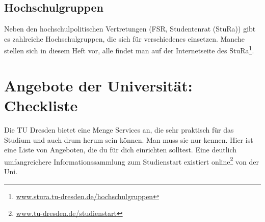 \documentclass{scrartcl}
\begin{document}
\subsection*{Hochschulgruppen}
\label{sub:hochschulgruppen}
Neben den hochschulpolitischen Vertretungen (FSR, Studentenrat (StuRa)) gibt es zahlreiche Hochschulgruppen,
die sich für verschiedenes einsetzen. Manche stellen sich in diesem Heft vor,
alle findet man auf der Internetseite des StuRa\footnote{\url{www.stura.tu-dresden.de/hochschulgruppen}}.

\section*{Angebote der Universität: Checkliste}
\label{sec:angebote_der_universitat}
Die TU Dresden bietet eine Menge Services an, die sehr praktisch für das Studium und auch drum herum sein können.
Man muss sie nur kennen. Hier ist eine Liste von Angeboten, die du für dich einrichten solltest.
Eine deutlich umfangreichere Informationssammlung zum Studienstart
existiert online\footnote{\url{www.tu-dresden.de/studienstart}} von der Uni.
\newcommand{\clitem}[1]{\item[$\square$ #1]}
\end{document}
